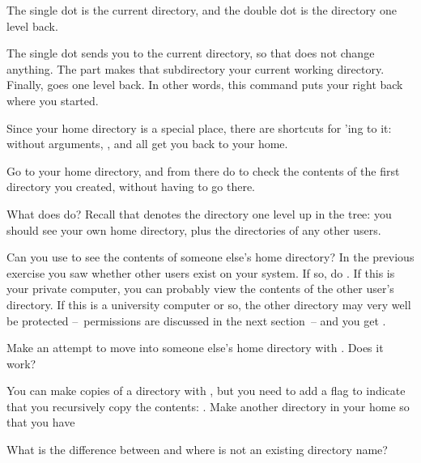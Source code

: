 
The single dot is the
current directory, and the double dot is the directory one level
back. 

{The single dot sends you to the current directory, so that does not
  change anything. The  part makes that subdirectory your
  current working directory. Finally,  goes one level back. In
  other words, this command puts your right back where you started.}{}

Since your home directory is a special place, there are shortcuts for
'ing to it:  without arguments, , and 
  all get you back to your home.

Go to your home directory, and from there do  to check
the contents of the first directory you created, without having to go
there.

\practical
{What does  do?}
{Recall that  denotes the
  directory one level up in the tree: you should see your own home
  directory, plus the directories of any other users.}{}

\practical
{Can you use  to see the
contents of someone else's home directory? In the previous exercise
  you saw whether other users exist on your system. If so, do .}
{If this is your private computer, you can
  probably view the contents of the other user's directory. If this is
  a university computer or so, the other directory may very well be
  protected --~permissions are discussed in the next section~-- and
  you get .}{}

Make an attempt to move into someone else's home directory with
. Does it work?

You can make copies of a directory with , but you need to add a
flag to indicate that you recursively copy the contents: . Make another directory  in your home so that you have


What is the difference between  and  where  is not an
existing directory name?

